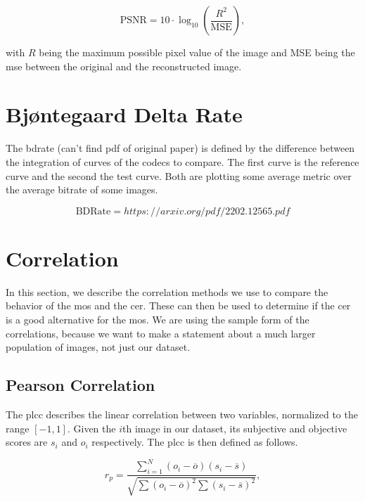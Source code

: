 \begin{equation}
    \text{PSNR} = 10 \cdot \log_{10} \left( \frac{R^2}{\text{MSE}} \right),
    \label{eq:psnr}
\end{equation}

with \(R\) being the maximum possible pixel value of the image and MSE being the \gls{mse} between the original and the reconstructed image.

\section{Bjøntegaard Delta Rate}
\label{subsec:bdrate}

The \gls{bdrate} \cite{bdrate_original_2001}\cite{bdrate_beyond_2022} (can't find pdf of original paper) is defined by the difference between the integration of curves of the codecs to compare.
The first curve is the reference curve and the second the test curve.
Both are plotting some average metric over the average bitrate of some images.

\begin{equation}
    \text{BDRate} = https://arxiv.org/pdf/2202.12565.pdf
    \label{eq:bdrate}
\end{equation}

\section{Correlation}
\label{sec:correlation}

In this section, we describe the correlation methods we use to compare the behavior of the \gls{mos} and the \gls{cer}.
These can then be used to determine if the \gls{cer} is a good alternative for the \gls{mos}.
We are using the sample form of the correlations, because we want to make a statement about a much larger population of images, not just our dataset.

\subsection{Pearson Correlation}
\label{subsec:pearson}

The \gls{plcc} \cite{pears_spear_2016} describes the linear correlation between two variables, normalized to the range $[-1, 1]$.
Given the $i$th image in our dataset, its subjective and objective scores are $s_i$ and $o_i$ respectively.
The \gls{plcc} is then defined as follows.

\begin{equation}
    r_p = \frac{\sum_{i=1}^{N}{(o_i-\overline{o})(s_i-\overline{s})}}{\sqrt{\sum{(o_i-\overline{o})^2}\sum{(s_i-\overline{s})^2}}},
    \label{eq:pearson}
\end{equation}

